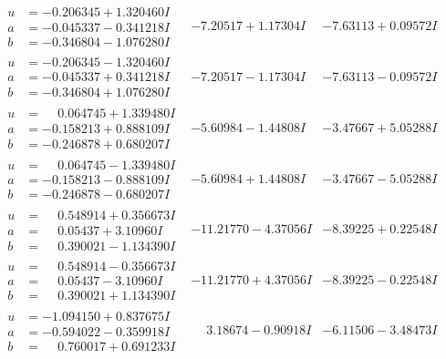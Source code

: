\documentclass[1p]{elsarticle_modified}
\theoremstyle{definition}
\begin{document}
$$\begin{array}{c|c|c}
\begin{aligned}
u &= -0.206345 + 1.320460 I \\
a &= -0.045337 - 0.341218 I \\
b &= -0.346804 - 1.076280 I\end{aligned}
 & -7.20517 + 1.17304 I & -7.63113 + 0.09572 I \\ \hline\begin{aligned}
u &= -0.206345 - 1.320460 I \\
a &= -0.045337 + 0.341218 I \\
b &= -0.346804 + 1.076280 I\end{aligned}
 & -7.20517 - 1.17304 I & -7.63113 - 0.09572 I \\ \hline\begin{aligned}
u &= \phantom{-}0.064745 + 1.339480 I \\
a &= -0.158213 + 0.888109 I \\
b &= -0.246878 + 0.680207 I\end{aligned}
 & -5.60984 - 1.44808 I & -3.47667 + 5.05288 I \\ \hline\begin{aligned}
u &= \phantom{-}0.064745 - 1.339480 I \\
a &= -0.158213 - 0.888109 I \\
b &= -0.246878 - 0.680207 I\end{aligned}
 & -5.60984 + 1.44808 I & -3.47667 - 5.05288 I \\ \hline\begin{aligned}
u &= \phantom{-}0.548914 + 0.356673 I \\
a &= \phantom{-}0.05437 + 3.10960 I \\
b &= \phantom{-}0.390021 - 1.134390 I\end{aligned}
 & -11.21770 - 4.37056 I & -8.39225 + 0.22548 I \\ \hline\begin{aligned}
u &= \phantom{-}0.548914 - 0.356673 I \\
a &= \phantom{-}0.05437 - 3.10960 I \\
b &= \phantom{-}0.390021 + 1.134390 I\end{aligned}
 & -11.21770 + 4.37056 I & -8.39225 - 0.22548 I \\ \hline\begin{aligned}
u &= -1.094150 + 0.837675 I \\
a &= -0.594022 - 0.359918 I \\
b &= \phantom{-}0.760017 + 0.691233 I\end{aligned}
 & \phantom{-}3.18674 - 0.90918 I & -6.11506 - 3.48473 I \\ \hline\begin{aligned}

\end{aligned}
\end{array}$$
\end{document}
